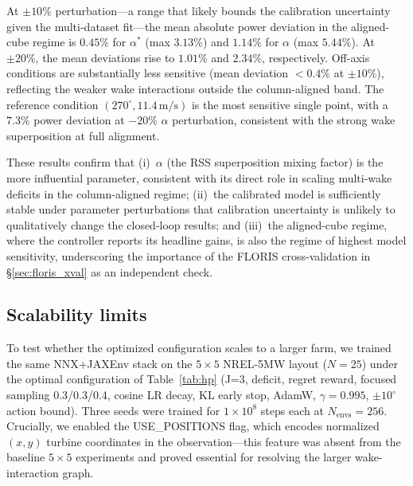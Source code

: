 \documentclass[final,5p,times]{elsarticle}
\begin{document}
At $\pm10\%$ perturbation---a range that likely bounds the calibration uncertainty given the multi-dataset fit---the mean absolute power deviation in the aligned-cube regime is $0.45\%$ for $\alpha^*$ (max $3.13\%$) and $1.14\%$ for $\alpha$ (max $5.44\%$). At $\pm20\%$, the mean deviations rise to $1.01\%$ and $2.34\%$, respectively. Off-axis conditions are substantially less sensitive (mean deviation ${<}0.4\%$ at $\pm10\%$), reflecting the weaker wake interactions outside the column-aligned band. The reference condition $(270^\circ, 11.4\,\mathrm{m/s})$ is the most sensitive single point, with a $7.3\%$ power deviation at $-20\%$ $\alpha$ perturbation, consistent with the strong wake superposition at full alignment.

These results confirm that (i)~$\alpha$ (the RSS superposition mixing factor) is the more influential parameter, consistent with its direct role in scaling multi-wake deficits in the column-aligned regime; (ii)~the calibrated model is sufficiently stable under parameter perturbations that calibration uncertainty is unlikely to qualitatively change the closed-loop results; and (iii)~the aligned-cube regime, where the controller reports its headline gains, is also the regime of highest model sensitivity, underscoring the importance of the FLORIS cross-validation in \S\ref{sec:floris_xval} as an independent check.
\medskip


\subsection{Scalability limits}\label{sec:scalability}

To test whether the optimized configuration scales to a larger farm, we trained the same NNX+JAXEnv stack on the $5{\times}5$ NREL-5MW layout ($N{=}25$) under the optimal configuration of Table~\ref{tab:hp} (J=3, deficit, regret reward, focused sampling 0.3/0.3/0.4, cosine LR decay, KL early stop, AdamW, $\gamma{=}0.995$, $\pm10^\circ$ action bound). Three seeds were trained for $1{\times}10^{8}$ steps each at $N_\mathrm{envs}{=}256$. Crucially, we enabled the USE\_POSITIONS flag, which encodes normalized $(x,y)$ turbine coordinates in the observation---this feature was absent from the baseline $5{\times}5$ experiments and proved essential for resolving the larger wake-interaction graph.
\end{document}
